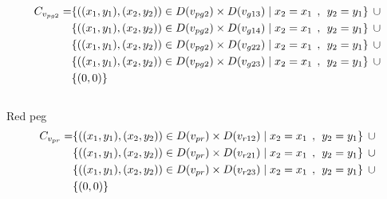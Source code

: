 \begin{align*}
C_{v_{pg2}} = &\{((x_{1},y_{1}),(x_{2},y_{2}))\in D(v_{pg2}) \times D(v_{g13})\mid x_{2} = x_{1} \hspace{1ex} , \hspace{1ex}  y_{2} = y_{1}\} \hspace{1ex} \cup 
\\&\{((x_{1},y_{1}),(x_{2},y_{2}))\in D(v_{pg2}) \times D(v_{g14})\mid x_{2} = x_{1} \hspace{1ex} , \hspace{1ex}  y_{2} = y_{1}\} \hspace{1ex} \cup 
\\&\{ ((x_{1},y_{1}),(x_{2},y_{2}))\in D(v_{pg2}) \times D(v_{g22})\mid x_{2} = x_{1} \hspace{1ex} , \hspace{1ex}  y_{2} = y_{1}\}\hspace{1ex} \cup 
\\&\{ ((x_{1},y_{1}),(x_{2},y_{2}))\in D(v_{pg2}) \times D(v_{g23})\mid x_{2} = x_{1} \hspace{1ex} , \hspace{1ex}  y_{2} = y_{1}\} \hspace{1ex} \cup 
\\&\{(0,0)\}
\end{align*}
\\ Red peg 
\begin{align*}
C_{v_{pr}} = &\{((x_{1},y_{1}),(x_{2},y_{2}))\in D(v_{pr}) \times D(v_{r12})\mid x_{2} = x_{1} \hspace{1ex} , \hspace{1ex}  y_{2} = y_{1}\} \hspace{1ex} \cup 
\\&\{((x_{1},y_{1}),(x_{2},y_{2}))\in D(v_{pr}) \times D(v_{r21})\mid x_{2} = x_{1} \hspace{1ex} , \hspace{1ex}  y_{2} = y_{1}\} \hspace{1ex} \cup 
\\&\{ ((x_{1},y_{1}),(x_{2},y_{2}))\in D(v_{pr}) \times D(v_{r23})\mid x_{2} = x_{1} \hspace{1ex} , \hspace{1ex}  y_{2} = y_{1}\}\hspace{1ex} \cup 
\\& \{(0,0)\}
\end{align*}
